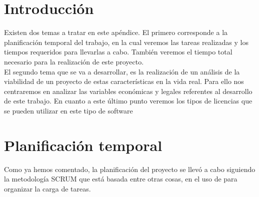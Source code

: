 
\section{Introducción}

Existen dos temas a tratar en este apéndice. 
El primero corresponde a la planificación temporal del trabajo, en la cual veremos las tareas realizadas y los tiempos requeridos para llevarlas a cabo. También veremos el tiempo total necesario para la realización de este proyecto.  \\
El segundo tema que se va a desarrollar, es la realización de un análisis de la viabilidad de un proyecto de estas características en la vida real. Para ello nos centraremos en analizar las variables económicas y legales referentes al desarrollo de este trabajo. En cuanto a este último punto veremos los tipos de licencias que se pueden utilizar en este tipo de software


\section{Planificación temporal}

Como ya hemos comentado, la planificación del proyecto se llevó a cabo siguiendo la metodología SCRUM que está basada entre otras cosas, en el uso de  para organizar la carga de tareas. 

